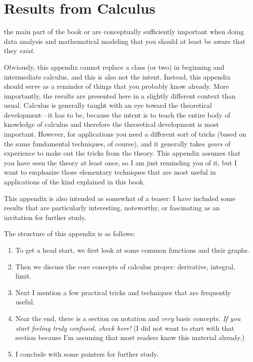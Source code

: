 

 
\chapter{Results from Calculus}{}{}
\label{app:calculus}
\makeatletter
\renewcommand\thefigure{B-\@arabic\c@figure}%
%
\renewcommand\thetable{B-\@arabic\c@table}%
\makeatother


 the main part of the book or are
conceptually sufficiently important when doing data analysis and
mathematical modeling that you should at least be aware that they
\emph{exist}.

Obviously, this appendix cannot replace a class (or two) in beginning
and intermediate calculus, and this is also not the intent. Instead,
this appendix should serve as a reminder of things that you probably
know already. More importantly, the results are presented here in a
slightly different context than usual. Calculus is generally taught
with an eye toward the theoretical development---it has to be, because
the intent is to teach the entire body of knowledge of 
calculus and therefore the theoretical development is most important.
However, for applications you need a different sort of tricks (based
on the same fundamental techniques, of course), and it generally takes
\emph{years} of experience to make out the tricks from the theory.
This appendix assumes that you have seen the theory at least once, so
I am just reminding you of it, but I want to emphasize those
elementary techniques that are most useful in applications of the kind
explained in this book.

This appendix is also intended as somewhat of a teaser: I have
included some results that are particularly interesting, noteworthy,
or fascinating as an invitation for further study.

The structure of this appendix is as follows:
\begin{enumerate}
\item To get a head start, we first look at some common functions and
  their graphs.
\item Then we discuss the core concepts of calculus proper:
  derivative, integral, limit.
\item Next I mention a few practical tricks and techniques that are
  frequently useful.\clearpage

\item Near the end, there is a section on notation and \emph{very}
  basic concepts. \emph{If you start feeling truly confused, check
    here!} (I did not want to start with that section because I'm
  assuming that most readers know this material already.)
\item I conclude with some pointers for further study.
\end{enumerate}

